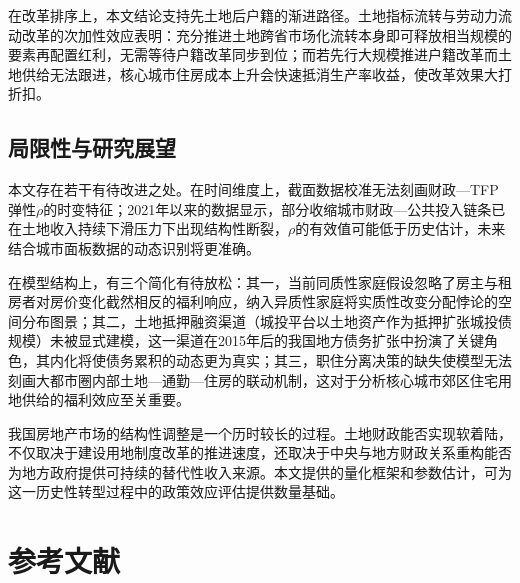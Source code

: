 \documentclass[UTF8,a4paper,12pt]{ctexart}
\theoremstyle{plain}
\theoremstyle{definition}
\theoremstyle{remark}
\begin{document}
在改革排序上，本文结论支持先土地后户籍的渐进路径。土地指标流转与劳动力流动改革的次加性效应表明：充分推进土地跨省市场化流转本身即可释放相当规模的要素再配置红利，无需等待户籍改革同步到位；而若先行大规模推进户籍改革而土地供给无法跟进，核心城市住房成本上升会快速抵消生产率收益，使改革效果大打折扣。

\subsection{局限性与研究展望}

本文存在若干有待改进之处。在时间维度上，截面数据校准无法刻画财政—TFP弹性$\rho$的时变特征；2021年以来的数据显示，部分收缩城市财政—公共投入链条已在土地收入持续下滑压力下出现结构性断裂，$\rho$的有效值可能低于历史估计，未来结合城市面板数据的动态识别将更准确。

在模型结构上，有三个简化有待放松：其一，当前同质性家庭假设忽略了房主与租房者对房价变化截然相反的福利响应，纳入异质性家庭将实质性改变分配悖论的空间分布图景；其二，土地抵押融资渠道（城投平台以土地资产作为抵押扩张城投债规模）未被显式建模，这一渠道在2015年后的我国地方债务扩张中扮演了关键角色，其内化将使债务累积的动态更为真实；其三，职住分离决策的缺失使模型无法刻画大都市圈内部土地—通勤—住房的联动机制，这对于分析核心城市郊区住宅用地供给的福利效应至关重要。

我国房地产市场的结构性调整是一个历时较长的过程。土地财政能否实现软着陆，不仅取决于建设用地制度改革的推进速度，还取决于中央与地方财政关系重构能否为地方政府提供可持续的替代性收入来源。本文提供的量化框架和参数估计，可为这一历史性转型过程中的政策效应评估提供数量基础。

\section*{参考文献}
\end{document}
